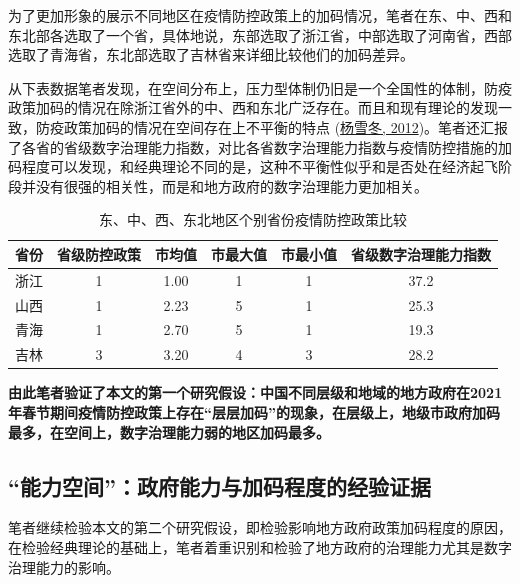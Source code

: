 \documentclass[
  12pt,
]{ctexart}
\begin{document}
为了更加形象的展示不同地区在疫情防控政策上的加码情况，笔者在东、中、西和东北部各选取了一个省，具体地说，东部选取了浙江省，中部选取了河南省，西部选取了青海省，东北部选取了吉林省来详细比较他们的加码差异。

从下表数据笔者发现，在空间分布上，压力型体制仍旧是一个全国性的体制，防疫政策加码的情况在除浙江省外的中、西和东北广泛存在。而且和现有理论的发现一致，防疫政策加码的情况在空间存在上不平衡的特点 (\protect\hyperlink{ref-YangXueDong2012}{杨雪冬, 2012})。笔者还汇报了各省的省级数字治理能力指数，对比各省数字治理能力指数与疫情防控措施的加码程度可以发现，和经典理论不同的是，这种不平衡性似乎和是否处在经济起飞阶段并没有很强的相关性，而是和地方政府的数字治理能力更加相关。

\begin{table}[!h]

\caption{\label{tab:unnamed-chunk-3}东、中、西、东北地区个别省份疫情防控政策比较}
\centering
\begin{tabular}[t]{cccccc}
\toprule
省份 & 省级防控政策 & 市均值 & 市最大值 & 市最小值 & 省级数字治理能力指数\\
\midrule
浙江 & 1 & 1.00 & 1 & 1 & 37.2\\
山西 & 1 & 2.23 & 5 & 1 & 25.3\\
青海 & 1 & 2.70 & 5 & 1 & 19.3\\
吉林 & 3 & 3.20 & 4 & 3 & 28.2\\
\bottomrule
\end{tabular}
\end{table}

\textbf{由此笔者验证了本文的第一个研究假设：中国不同层级和地域的地方政府在2021年春节期间疫情防控政策上存在``层层加码''的现象，在层级上，地级市政府加码最多，在空间上，数字治理能力弱的地区加码最多。}

\hypertarget{ux80fdux529bux7a7aux95f4ux653fux5e9cux80fdux529bux4e0eux52a0ux7801ux7a0bux5ea6ux7684ux7ecfux9a8cux8bc1ux636e}{%
\subsection{``能力空间''：政府能力与加码程度的经验证据}\label{ux80fdux529bux7a7aux95f4ux653fux5e9cux80fdux529bux4e0eux52a0ux7801ux7a0bux5ea6ux7684ux7ecfux9a8cux8bc1ux636e}}

笔者继续检验本文的第二个研究假设，即检验影响地方政府政策加码程度的原因，在检验经典理论的基础上，笔者着重识别和检验了地方政府的治理能力尤其是数字治理能力的影响。
\end{document}
